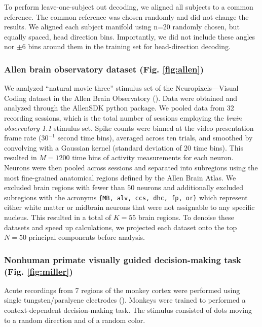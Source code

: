 To perform leave-one-subject out decoding, we aligned all subjects to a common reference. The common reference was chosen randomly and did not change the results. We aligned each subject manifold using n=20 randomly chosen, but equally spaced, head direction bins. Importantly, we did not include these angles nor $\pm$6 bins around them in the training set for head-direction decoding.

\subsubsection{Allen brain observatory dataset (Fig. \ref{fig:allen})}

We analyzed ``natural movie three'' stimulus set of the Neuropixels---Visual Coding dataset in the Allen Brain Observatory (\cite{Siegle2021-hs}).
Data were obtained and analyzed through the AllenSDK python package.
We pooled data from 32 recording sessions, which is the total number of sessions employing the \textit{brain observatory 1.1} stimulus set.
Spike counts were binned at the video presentation frame rate ($30^{-1}$ second time bins), averaged across ten trials, and smoothed by convolving with a Gaussian kernel (standard deviation of 20 time bins).
This resulted in $M=1200$ time bins of activity measurements for each neuron.
Neurons were then pooled across sessions and separated into subregions using the most fine-grained anatomical regions defined by the Allen Brain Atlas.
We excluded brain regions with fewer than $50$ neurons and additionally excluded subregions with the acronyms \texttt{\{MB, alv, ccs, dhc, fp, or\}} which represent either white matter or midbrain neurons that were not assignable to any specific nucleus.
This resulted in a total of $K=55$ brain regions.
To denoise these datasets and speed up calculations, we projected each dataset onto the top $N=50$ principal components before analysis.

\subsubsection{Nonhuman primate visually guided decision-making task (Fig. \ref{fig:miller})}

Acute recordings from 7 regions of the monkey cortex were performed using single tungsten/paralyene electrodes (\cite{Siegel2015-cz}). Monkeys were trained to performed a context-dependent decision-making task. The stimulus consisted of dots moving to a random direction and of a random color. 

